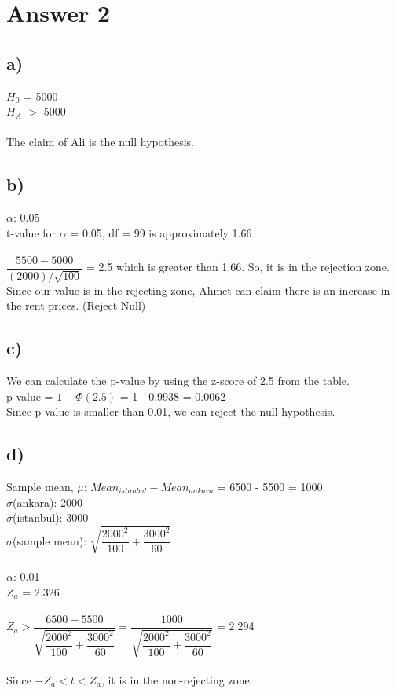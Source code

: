 \documentclass[12pt]{article}
\begin{document}
\section*{Answer 2}

\subsection*{a)}
$H_0$ = 5000\\
$H_A$ $>$ 5000\\
\\
The claim of Ali is the null hypothesis. 

\subsection*{b)} 
$\alpha$: 0.05\\
t-value for $\alpha$ = 0.05, df = 99 is approximately 1.66\\
\\
$\dfrac{5500 - 5000}{(2000)/\sqrt{100}}$ = 2.5 which is greater than 1.66. So, it is in the rejection zone. Since our value is in the rejecting zone, Ahmet can claim there is an increase in the rent prices. (Reject Null)\\

\subsection*{c)} 

We can calculate the p-value by using the z-score of 2.5 from the table.\\
p-value = $1 - \Phi (2.5)$ = 1 - 0.9938 = 0.0062\\
Since p-value is smaller than 0.01, we can reject the null hypothesis.\\


\subsection*{d)} 
Sample mean, $\mu$: $Mean_{istanbul} - Mean_{ankara}$ = 6500 - 5500 = 1000\\
$\sigma$(ankara): 2000 \\
$\sigma$(istanbul): 3000 \\
$\sigma$(sample mean): $\sqrt{\dfrac{2000^2}{100} + \dfrac{3000^2}{60}}$\\
\\
$\alpha$: 0.01\\
$Z_a$ = 2.326\\ 
\\
$Z_a > \dfrac{6500 - 5500}{\sqrt{\dfrac{2000^2}{100} + \dfrac{3000^2}{60}}} =  \dfrac{1000}{\sqrt{\dfrac{2000^2}{100} + \dfrac{3000^2}{60}}}$ = 2.294
\\ 
\\
Since $-Z_a < t < Z_a$, it is in the non-rejecting zone.\\
\end{document}
